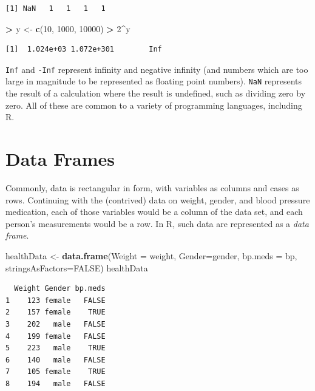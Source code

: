 \documentclass[
]{krantz}
\makeatletter
\newenvironment{Shaded}{\begin{snugshade}}{\end{snugshade}}
\newcommand{\DataTypeTok}[1]{\textcolor[rgb]{0.27,0.27,0.27}{#1}}
\newcommand{\DecValTok}[1]{\textcolor[rgb]{0.06,0.06,0.06}{#1}}
\newcommand{\KeywordTok}[1]{\textcolor[rgb]{0.27,0.27,0.27}{\textbf{#1}}}
\newcommand{\NormalTok}[1]{#1}
\newcommand{\OperatorTok}[1]{\textcolor[rgb]{0.43,0.43,0.43}{\textbf{#1}}}
\newcommand{\OtherTok}[1]{\textcolor[rgb]{0.37,0.37,0.37}{#1}}
\newcommand{\StringTok}[1]{\textcolor[rgb]{0.5,0.5,0.5}{#1}}
\newenvironment{kframe}{%
\medskip{}
\setlength{\fboxsep}{.8em}
 \def\at@end@of@kframe{}%
 \ifinner\ifhmode%
  \def\at@end@of@kframe{\end{minipage}}%
  \begin{minipage}{\columnwidth}%
 \fi\fi%
 \def\FrameCommand##1{\hskip\@totalleftmargin \hskip-\fboxsep
 \colorbox{shadecolor}{##1}\hskip-\fboxsep
     \hskip-\linewidth \hskip-\@totalleftmargin \hskip\columnwidth}%
 \MakeFramed {\advance\hsize-\width
   \@totalleftmargin\z@ \linewidth\hsize
   \@setminipage}}%
 {\par\unskip\endMakeFramed%
 \at@end@of@kframe}
\renewenvironment{Shaded}{\begin{kframe}}{\end{kframe}}
\makeatother
\begin{document}
\begin{verbatim}
[1] NaN   1   1   1   1
\end{verbatim}

\begin{Shaded}
\begin{Highlighting}[]
\OperatorTok{\textgreater{}}\StringTok{ }\NormalTok{y \textless{}{-}}\StringTok{ }\KeywordTok{c}\NormalTok{(}\DecValTok{10}\NormalTok{, }\DecValTok{1000}\NormalTok{, }\DecValTok{10000}\NormalTok{)}
\OperatorTok{\textgreater{}}\StringTok{ }\DecValTok{2}\OperatorTok{\^{}}\NormalTok{y}
\end{Highlighting}
\end{Shaded}

\begin{verbatim}
[1]  1.024e+03 1.072e+301        Inf
\end{verbatim}

\texttt{Inf} and \texttt{-Inf} represent infinity and negative infinity (and numbers which are too large in magnitude to be represented as floating point numbers). \texttt{NaN} represents the result of a calculation where the result is undefined, such as dividing zero by zero. All of these are common to a variety of programming languages, including R.

\hypertarget{dataFrames}{%
\section{Data Frames}\label{dataFrames}}

Commonly, data is rectangular in form, with variables as columns and cases as rows. Continuing with the (contrived) data on weight, gender, and blood pressure medication, each of those variables would be a column of the data set, and each person's measurements would be a row. In R, such data are represented as a \emph{data frame}.

\begin{Shaded}
\begin{Highlighting}[]
\NormalTok{healthData \textless{}{-}}\StringTok{ }\KeywordTok{data.frame}\NormalTok{(}\DataTypeTok{Weight =}\NormalTok{ weight, }\DataTypeTok{Gender=}\NormalTok{gender, }\DataTypeTok{bp.meds =}\NormalTok{ bp,}
                         \DataTypeTok{stringsAsFactors=}\OtherTok{FALSE}\NormalTok{)}
\NormalTok{healthData}
\end{Highlighting}
\end{Shaded}

\begin{verbatim}
  Weight Gender bp.meds
1    123 female   FALSE
2    157 female    TRUE
3    202   male   FALSE
4    199 female   FALSE
5    223   male    TRUE
6    140   male   FALSE
7    105 female    TRUE
8    194   male   FALSE
\end{verbatim}
\end{document}
